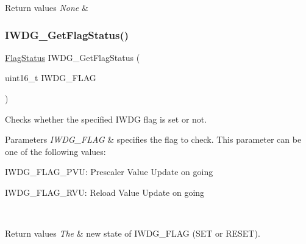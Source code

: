 \begin{DoxyRetVals}{Return values}
{\em None} & \\
\hline
\end{DoxyRetVals}
\mbox{\label{group___i_w_d_g___exported___functions_ga37f050cfbedc0c15f9e0816c0b22011e}} 
\subsubsection{\texorpdfstring{IWDG\_GetFlagStatus()}{IWDG\_GetFlagStatus()}}
{\footnotesize\ttfamily \mbox{\hyperlink{group___exported__types_ga89136caac2e14c55151f527ac02daaff}{Flag\+Status}} I\+W\+D\+G\+\_\+\+Get\+Flag\+Status (\begin{DoxyParamCaption}\item[{uint16\+\_\+t}]{I\+W\+D\+G\+\_\+\+F\+L\+AG }\end{DoxyParamCaption})}



Checks whether the specified I\+W\+DG flag is set or not. 


\begin{DoxyParams}{Parameters}
{\em I\+W\+D\+G\+\_\+\+F\+L\+AG} & specifies the flag to check. This parameter can be one of the following values\+: \begin{DoxyItemize}
\item I\+W\+D\+G\+\_\+\+F\+L\+A\+G\+\_\+\+P\+VU\+: Prescaler Value Update on going \item I\+W\+D\+G\+\_\+\+F\+L\+A\+G\+\_\+\+R\+VU\+: Reload Value Update on going \end{DoxyItemize}
\\
\hline
\end{DoxyParams}

\begin{DoxyRetVals}{Return values}
{\em The} & new state of I\+W\+D\+G\+\_\+\+F\+L\+AG (S\+ET or R\+E\+S\+ET). \\
\hline
\end{DoxyRetVals}
\mbox{\label{group___i_w_d_g___exported___functions_ga7147ebabdc3fef97f532b171a4e70d49}} 
